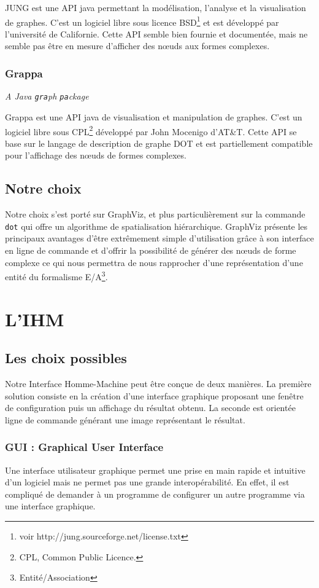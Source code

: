 				JUNG est une API java permettant la modélisation, l'analyse et la visualisation de graphes. C'est un logiciel libre sous licence BSD\footnote{voir http://jung.sourceforge.net/license.txt} et est développé par l'université de Californie. Cette API semble bien fournie et documentée, mais ne semble pas être en mesure d'afficher des nœuds aux formes complexes. 
		\subsubsection{Grappa} \textit{A Java \texttt{gra}ph \texttt{pa}ckage}
		
			Grappa est une API java de visualisation et manipulation de graphes. C'est un logiciel libre sous CPL\footnote{CPL, Common Public Licence.} développé par John Mocenigo d'AT\&T. Cette API se base sur le langage de description de graphe DOT et est partiellement compatible pour l'affichage des nœuds de formes complexes.
		
				
  \subsection{Notre choix}
		Notre choix s'est porté sur GraphViz, et plus particulièrement sur la commande \texttt{dot} qui offre un algorithme de spatialisation hiérarchique. GraphViz présente les principaux avantages d'être extrêmement simple d'utilisation grâce à son interface en ligne de commande et d'offrir la possibilité de générer des nœuds de forme complexe ce qui nous permettra de nous rapprocher d'une représentation d'une entité du formalisme E/A\footnote{Entité/Association}.

\section{L'IHM}	
	\subsection{Les choix possibles}
	\label{ihm_choix_possibles}
		Notre Interface Homme-Machine peut être conçue de deux manières. La première solution consiste en la création d'une interface graphique proposant une fenêtre de configuration puis un affichage du résultat obtenu. La seconde est orientée ligne de commande générant une image représentant le résultat. 	
	
		\subsubsection{GUI : \og Graphical User Interface \fg{}}
			Une interface utilisateur graphique permet une prise en main rapide et intuitive d'un logiciel mais ne permet pas une grande interopérabilité. En effet, il est compliqué de demander à un programme de configurer un autre programme via une interface graphique.
			
